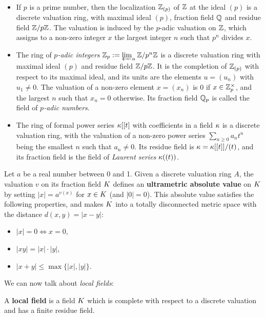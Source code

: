 \documentclass[a4paper, oneside]{memoir}
\begin{document}
\begin{example}\label{ex:DVR}\
    \begin{itemize}
        \item If $p$ is a prime number, then the localization $\mathbb{Z}_{(p)}$ of $\mathbb{Z}$ at the ideal $(p)$ is a discrete valuation ring, with maximal ideal $(p)$, fraction field $\mathbb{Q}$ and residue field
              $\mathbb{Z}/p\mathbb{Z}$. The valuation is induced by the $p$-adic valuation on $\mathbb{Z}$, which assigns to a non-zero integer $x$ the largest integer $n$ such that $p^n$ divides $x$.
        \item The ring of \textit{$p$-adic integers} $\mathbb{Z}_p:=\varprojlim_n{\mathbb{Z}/p^n\mathbb{Z}}$ is a discrete valuation ring with maximal ideal $(p)$ and residue field $\mathbb{Z}/p\mathbb{Z}$. It is the completion of
              $\mathbb{Z}_{(p)}$ with respect to its maximal ideal, and its units are the elements $u=(u_n)$ with $u_1\neq 0$. The valuation of a non-zero element $x=(x_n)$ is $0$ if
              $x\in\mathbb{Z}_p^\times$, and the largest $n$ such that $x_n= 0$ otherwise. Its fraction field $\mathbb{Q}_p$ is called the field of \textit{$p$-adic numbers}.
        \item The ring of formal power series $\kappa[[t]$ with coefficients in a field $\kappa$ is a discrete valuation ring, with the valuation of a non-zero power series $\sum_{n\geq
                      0}{a_nt^n}$ being the smallest $n$ such that $a_n\neq 0$. Its residue field is $\kappa=\kappa[[t]]/(t)$, and its fraction field is the field of \textit{Laurent series} $\kappa((t))$.
    \end{itemize}
\end{example}

Let $a$ be a real number between 0 and 1. Given a discrete valuation ring $A$, the valuation $v$ on its fraction field $K$ defines an \textbf{ultrametric absolute value} on $K$ by setting $|x|=a^{v(x)}$ for $x\in K$ (and
$|0|=0$). This absolute value satisfies the following properties, and makes $K$ into a totally disconnected metric space with the distance $d(x,y)=|x-y|$:
\begin{itemize}
    \item $|x|=0 \iff x=0$,
    \item $|xy|=|x|\cdot|y|$,
    \item $|x+y|\leq\max\{|x|,|y|\}$.
\end{itemize}

We can now talk about \textit{local fields}:

\begin{definition}
    A \textbf{local field} is a field $K$ which is complete with respect to a discrete valuation and has a finite residue field.
\end{definition}
\end{document}

